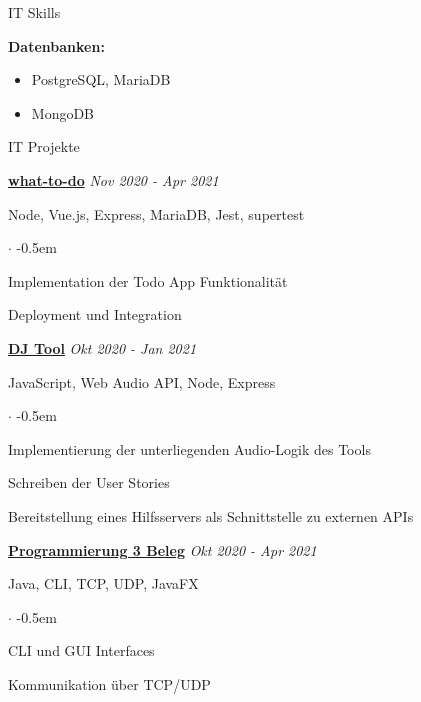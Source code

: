 \documentclass{cv}
\begin{document}
\begin{rSection}{IT Skills}
\begin{minipage}[t]{\skillWidth\linewidth}
    \textbf{Datenbanken:}
    \begin{itemize}
      \item PostgreSQL, MariaDB
      \item MongoDB
    \end{itemize}


  \end{minipage}
\end{rSection}

\begin{rSection}{IT Projekte}

  \textbf{\href{https://github.com/jneidel/what-to-do}{what-to-do}}
  \hfill
  {\em Nov 2020 - Apr 2021}

  Node, Vue.js, Express, MariaDB, Jest, supertest

  \begin{list}{$\cdot$}{}
    \itemsep -0.5em \vspace{-0.5em} %
    \smallskip
    \item Implementation der Todo App Funktionalität
    \item Deployment und Integration
  \end{list}

  \textbf{\href{https://github.com/vyvytn/avt}{DJ Tool}}
  \hfill
  {\em Okt 2020 - Jan 2021}

  JavaScript, Web Audio API, Node, Express
  \begin{list}{$\cdot$}{}
    \itemsep -0.5em \vspace{-0.5em}
    \smallskip
    \item Implementierung der unterliegenden Audio-Logik des Tools
    \item Schreiben der User Stories
    \item Bereitstellung eines Hilfsservers als Schnittstelle zu externen APIs
  \end{list}

  \textbf{\href{https://github.com/jneidel/htw-prog3}{Programmierung 3 Beleg}}
  \hfill
  {\em Okt 2020 - Apr 2021}

  Java, CLI, TCP, UDP, JavaFX
  \begin{list}{$\cdot$}{}
    \itemsep -0.5em \vspace{-0.5em}
    \smallskip
    \item CLI und GUI Interfaces
    \item Kommunikation über TCP/UDP
  \end{list}


\end{rSection}
\end{document}
